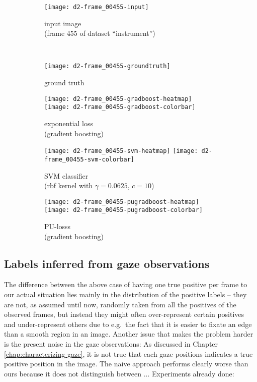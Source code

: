 \begin{figure}[ht]
	\centering
 	\begin{subfigure}[h]{0.48\textwidth}
	  \texttt{[image: d2-frame\_00455-input]}
	  \caption*{input image \\ (frame 455 of dataset ``instrument'')}
	\end{subfigure}
	~
	\begin{subfigure}[h]{0.48\textwidth}
	  \texttt{[image: d2-frame\_00455-groundtruth]}
	  \caption*{ground truth \\ \quad}
	\end{subfigure}
	
	\vspace{3mm}
	\begin{subfigure}[h]{0.495\textwidth}
	  \texttt{[image: d2-frame\_00455-gradboost-heatmap]}
	  \texttt{[image: d2-frame\_00455-gradboost-colorbar]}
	  \caption*{exponential loss \\ (gradient boosting)}
	\end{subfigure}
	
	\vspace{3mm}
	\begin{subfigure}[h]{0.495\textwidth}
	  \texttt{[image: d2-frame\_00455-svm-heatmap]}
	  \texttt{[image: d2-frame\_00455-svm-colorbar]}
	  \caption*{SVM classifier \\ (rbf kernel with $\gamma = 0.0625$, $c = 10$)\\}
	\end{subfigure}	
	\begin{subfigure}[h]{0.495\textwidth}
	  \texttt{[image: d2-frame\_00455-pugradboost-heatmap]}
	  \texttt{[image: d2-frame\_00455-pugradboost-colorbar]}
		  \caption*{PU-losss \\ (gradient boosting)}
	\end{subfigure}		
	\caption{}
	\label{fig:bias-in-heatmaps}
\end{figure}

\subsection{Labels inferred from gaze observations}
The difference between the above case of having one true positive per frame to our actual situation lies mainly in the distribution of the positive labels -- they are not, as assumed until now, randomly taken from all the positives of the observed frames, but instead they might often over-represent certain positives and under-represent others due to e.g.\ the fact that it is easier to fixate an edge than a smooth region in an image. 
Another issue that makes the problem harder is the present noise in the gaze observations: As discussed in Chapter \ref{chap:characterizing-gaze}, it is not true that each gaze positions indicates a true positive position in the image.
The naive approach performs clearly worse than ours because it does not distinguish between ...  Experiments already done:


